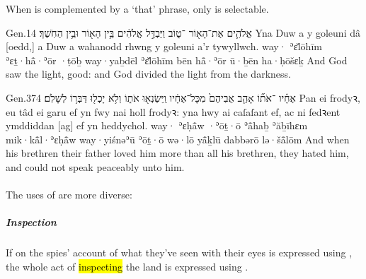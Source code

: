 
\begin{paper}
	{\click} When  is complemented by a  ‘that’ phrase, only  is selectable.
\end{paper}

\begin{example}{Gen.}{1}{4}{}{}
	\quoling
	{ אֱלֹהִ֛ים אֶת־הָא֖וֹר ־ט֑וֹב וַיַּבְדֵּ֣ל אֱלֹהִ֔ים בֵּ֥ין הָא֖וֹר וּבֵ֥ין הַחֹֽשֶׁךְ׃}
	{Yna Duw a  y goleuni  dâ [oedd,] a Duw a wahanodd rhwng y goleuni a’r tywyllwch.}
	{way· ʾɛ̆lōhīm ʾɛṯ·hå̄·ʾōr ·ṭōḇ way·yaḇdēl ʾɛ̆lōhīm bēn hå̄·ʾōr ū·ḇēn ha·ḥōšɛḵ}
	{And God saw the light,   good: and God divided the light from the darkness.}
\end{example}

\begin{example}{Gen.}{37}{4}{}{}
	\quoling
	{ אֶחָ֗יו ־אֹת֞וֹ אָהַ֤ב אֲבִיהֶם֙ מִכָּל־אֶחָ֔יו וַֽיִּשְׂנְא֖וּ אֹת֑וֹ וְלֹ֥א יָכְל֖וּ דַּבְּר֥וֹ לְשָׁלֹֽם׃}
	{Pan  ei frodyꝛ,  eu tâd  ei garu ef yn fwy nai holl frodyꝛ: yna hwy ai caſaſant ef, ac ni fedꝛent ymddiddan [ag] ef yn heddychol.}
	{way· ʾɛḥå̄w ·ʾōṯ·ō ʾå̄haḇ ʾăḇīhɛm mik·kå̄l·ʾɛḥå̄w way·yiśnəʾū ʾōṯ·ō wə·lō yå̄ḵlū dabbərō lə·šå̄lōm}
	{And when his brethren   their father loved him more than all his brethren, they hated him, and could not speak peaceably unto him.}
\end{example}



\paragraph{}

\begin{paper}
	The uses of  are more diverse:
\end{paper}



\subparagraph{Inspection}

\begin{paper}
	If on  the spies’ account of what they’ve seen with their eyes is expressed using , the whole act of \hl{inspecting} the land is expressed using .
\end{paper}

